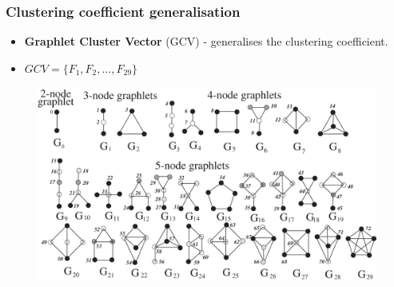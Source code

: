 \documentclass[11pt,xcolor=table]{beamer}
\begin{document}
\begin{frame}
  \frametitle{Clustering coefficient generalisation}
  
  \begin{itemize}
   \item \textbf{Graphlet Cluster Vector} (GCV) - generalises the clustering coefficient. 
   \item $GCV = \{F_1, F_2, \dots, F_{29}\}$
  \end{itemize}
  
  \vfill
  

\begin{figure}
 \centering
 \includegraphics[scale=0.20]{../report_imperial/images/graphlets.jpg} 
\end{figure}

\end{frame}

%  
% 
%   
%   
% 
%     
% 	
%   
% 
%  
\end{document}

